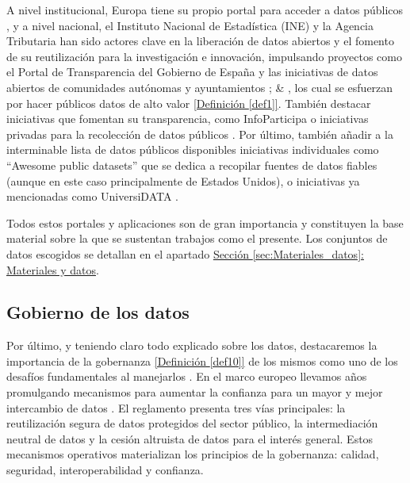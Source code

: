 	A nivel institucional, Europa tiene su propio portal para acceder a datos públicos \citep{PortalDatosEuropa}, y a nivel nacional, el Instituto Nacional de Estadística (INE) y la Agencia Tributaria han sido actores clave en la liberación de datos abiertos y el fomento de su reutilización para la investigación e innovación, impulsando proyectos como el Portal de Transparencia del Gobierno de España y las iniciativas de datos abiertos de comunidades autónomas y ayuntamientos \citep{PortalDatosGob}; \citep{PortalDatosMadrid} \& \citep{PortalRegistradores}, los cual se esfuerzan por hacer públicos datos de alto valor \hyperref[def1]{[Definición \ref*{def1}]}. También destacar iniciativas que fomentan su transparencia, como InfoParticipa \citep{PortalInfoparticipa} o iniciativas privadas para la recolección de datos públicos \citep{PortalEsriEspanna}. Por último, también añadir a la interminable lista de datos públicos disponibles iniciativas individuales como ``Awesome public datasets'' \citep{awesomePublicDatasets} que se dedica a recopilar fuentes de datos fiables (aunque en este caso principalmente de Estados Unidos), o iniciativas ya mencionadas como UniversiDATA \citep{UniversiDATA}.
	
	Todos estos portales y aplicaciones son de gran importancia y constituyen la base material sobre la que se sustentan trabajos como el presente. Los conjuntos de datos escogidos se detallan en el apartado \hyperref[sec:Materiales_datos]{Sección \ref*{sec:Materiales_datos}: Materiales y datos}. \\
	
	\subsection{Gobierno de los datos} \label{sec:EstudiosDatosGobernanza}
	
	Por último, y teniendo claro todo explicado sobre los datos, destacaremos la importancia de la gobernanza \hyperref[def10]{[Definición \ref*{def10}]} de los mismos como uno de los desafíos fundamentales al manejarlos \citep{DataManagement2024Theodorakopoulos}. En el marco europeo llevamos años promulgando mecanismos para aumentar la confianza para un mayor y mejor intercambio de datos \citep{EU_DGA_2022}. El reglamento presenta tres vías principales: la reutilización segura de datos protegidos del sector público, la intermediación neutral de datos y la cesión altruista de datos para el interés general. Estos mecanismos operativos materializan los principios de la gobernanza: calidad, seguridad, interoperabilidad y confianza.
	

